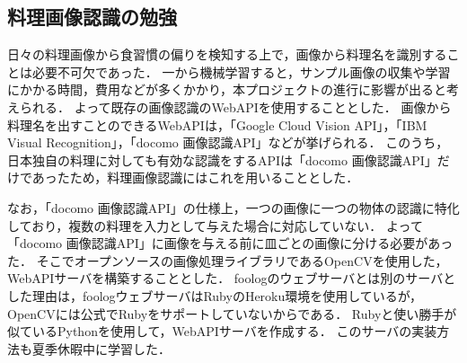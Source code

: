 \documentclass[../report]{subfiles}
\begin{document}
\subsection{料理画像認識の勉強}
日々の料理画像から食習慣の偏りを検知する上で，画像から料理名を識別することは必要不可欠であった．
一から機械学習すると，サンプル画像の収集や学習にかかる時間，費用などが多くかかり，本プロジェクトの進行に影響が出ると考えられる．
よって既存の画像認識のWebAPIを使用することとした．
画像から料理名を出すことのできるWebAPIは，「Google Cloud Vision API」，「IBM Visual Recognition」，「docomo 画像認識API」などが挙げられる．
このうち，日本独自の料理に対しても有効な認識をするAPIは「docomo 画像認識API」だけであったため，料理画像認識にはこれを用いることとした．

なお，「docomo 画像認識API」の仕様上，一つの画像に一つの物体の認識に特化しており，複数の料理を入力として与えた場合に対応していない．
よって「docomo 画像認識API」に画像を与える前に皿ごとの画像に分ける必要があった．
そこでオープンソースの画像処理ライブラリであるOpenCVを使用した，WebAPIサーバを構築することとした．
foologのウェブサーバとは別のサーバとした理由は，foologウェブサーバはRubyのHeroku環境を使用しているが，OpenCVには公式でRubyをサポートしていないからである．
Rubyと使い勝手が似ているPythonを使用して，WebAPIサーバを作成する．
このサーバの実装方法も夏季休暇中に学習した．
\end{document}
